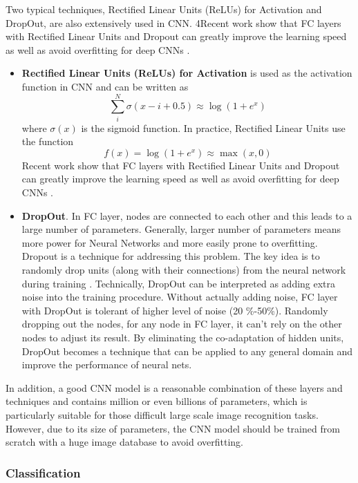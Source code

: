 Two typical techniques, Rectified Linear Units (ReLUs) for Activation and DropOut, are also extensively used in CNN. 4Recent work show that FC layers with Rectified Linear Units and Dropout can greatly improve the learning speed as well as avoid overfitting for deep CNNs \cite{hinton2012improving} \cite{nair2010rectified}.
\begin{itemize}
	\item \textbf{Rectified Linear Units (ReLUs) for Activation} is used as the activation function in CNN and can be written as 
	\begin{equation}
	\sum\limits_i^N {\sigma (x - i + 0.5)}  \approx \log (1 + {e^x})
	\end{equation}
	where $\sigma(x)$ is the sigmoid function. In practice, Rectified Linear Units use the function 
	\begin{equation}
	f(x) = \log (1 + {e^x}) \approx \max(x,0) 
	\end{equation}\label{eq:intro:relu}
	Recent work show that FC layers with Rectified Linear Units and Dropout can greatly improve the learning speed as well as avoid overfitting for deep CNNs \cite{hinton2012improving} \cite{nair2010rectified}.
	
	\item \textbf{DropOut}. In FC layer, nodes are connected to each other and this leads to a large number of parameters. Generally, larger number of parameters means more power for Neural Networks and more easily prone to overfitting. Dropout is a technique for addressing this problem. 	The key idea is to randomly drop units (along with their connections) from the neural network during training \cite{srivastava2014dropout}. Technically, DropOut can be interpreted as adding extra noise into the training procedure. Without actually adding noise, FC layer with DropOut is tolerant of higher level of noise (20 \%-50\%). Randomly dropping out the nodes, for any node in FC layer, it can't rely on the other nodes to adjust its result. By eliminating the co-adaptation of hidden units, DropOut becomes a technique that can be applied to any general domain and improve the performance of neural nets.   
\end{itemize}

In addition, a good CNN model is a reasonable combination of these layers and techniques and contains million or even billions of parameters, which is particularly suitable for those difficult large scale image recognition tasks. However, due to its size of parameters, the CNN model should be trained from scratch with a huge image database to avoid overfitting.

\subsubsection{Classification}





